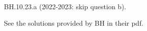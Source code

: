 

\setcounter{theorem}{22}
\begin{exercise} BH.10.23.a (2022-2023: skip question b).
\begin{solution}
See the solutions provided by BH in their pdf.

\end{solution}
\end{exercise}



